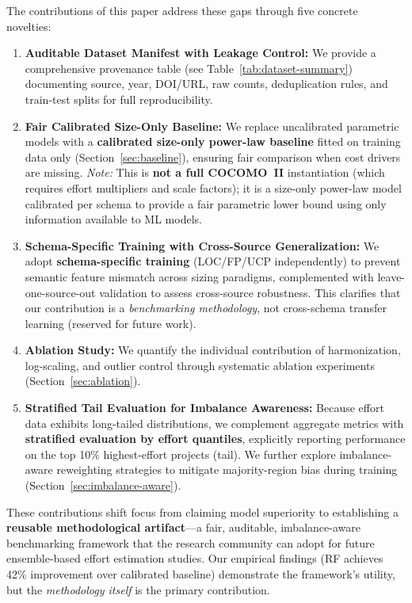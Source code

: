 \documentclass{ieeeaccess}
\begin{document}
\noindent The contributions of this paper address these gaps through five concrete novelties:
\begin{enumerate}[leftmargin=2em]
    \item \textbf{Auditable Dataset Manifest with Leakage Control:} We provide a comprehensive provenance table (see Table~\ref{tab:dataset-summary}) documenting source, year, DOI/URL, raw counts, deduplication rules, and train-test splits for full reproducibility.
    \item \textbf{Fair Calibrated Size-Only Baseline:} We replace uncalibrated parametric models with a \textbf{calibrated size-only power-law baseline} fitted on training data only (Section~\ref{sec:baseline}), ensuring fair comparison when cost drivers are missing. \textit{Note:} This is \textbf{not a full COCOMO~II} instantiation (which requires effort multipliers and scale factors); it is a size-only power-law model calibrated per schema to provide a fair parametric lower bound using only information available to ML models.
    \item \textbf{Schema-Specific Training with Cross-Source Generalization:} We adopt \textbf{schema-specific training} (LOC/FP/UCP independently) to prevent semantic feature mismatch across sizing paradigms, complemented with leave-one-source-out validation to assess cross-source robustness. This clarifies that our contribution is a \emph{benchmarking methodology}, not cross-schema transfer learning (reserved for future work).
    \item \textbf{Ablation Study:} We quantify the individual contribution of harmonization, log-scaling, and outlier control through systematic ablation experiments (Section~\ref{sec:ablation}).
    \item \textbf{Stratified Tail Evaluation for Imbalance Awareness:} Because effort data exhibits long-tailed distributions, we complement aggregate metrics with \textbf{stratified evaluation by effort quantiles}, explicitly reporting performance on the top 10\% highest-effort projects (tail). We further explore imbalance-aware reweighting strategies to mitigate majority-region bias during training (Section~\ref{sec:imbalance-aware}).
\end{enumerate}

\noindent These contributions shift focus from claiming model superiority to establishing a \textbf{reusable methodological artifact}---a fair, auditable, imbalance-aware benchmarking framework that the research community can adopt for future ensemble-based effort estimation studies. Our empirical findings (RF achieves 42\% improvement over calibrated baseline) demonstrate the framework's utility, but the \emph{methodology itself} is the primary contribution.
\end{document}
